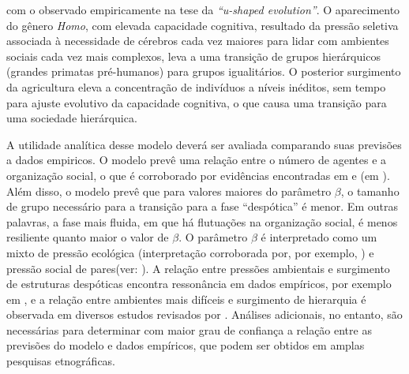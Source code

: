 com o observado empiricamente na tese da \textit{``u-shaped evolution''}. O aparecimento do gênero \textit{Homo}, com elevada capacidade cognitiva, resultado da pressão seletiva associada à necessidade de cérebros cada vez maiores para lidar com ambientes sociais cada vez mais complexos, leva a uma transição de grupos hierárquicos (grandes primatas pré-humanos) para grupos igualitários. O posterior surgimento da agricultura eleva a concentração de indivíduos a níveis inéditos, sem tempo para ajuste evolutivo da capacidade cognitiva, o que causa uma transição para uma sociedade hierárquica. 

A utilidade analítica desse modelo deverá ser avaliada comparando suas previsões a dados empiricos. O modelo prevê uma relação entre o número de agentes e a organização social, o que é corroborado por evidências encontradas em \citet{Currie2010}\cite{Currie2010} e \citet{Kennett2008}\cite{Kennett2008}(em \citet{Clark2008}). Além disso, o modelo prevê que para valores maiores do parâmetro $\beta$, o tamanho de grupo necessário para a transição para a fase ``despótica'' é menor. Em outras palavras, a fase mais fluida, em que há flutuações na organização social, é menos resiliente quanto maior o valor de $\beta$. O parâmetro $\beta$ é interpretado como um mixto de pressão ecológica (interpretação corroborada por, por exemplo, \citet{Earle1997}\cite{Earle1997}) e pressão social de pares(ver: \citet{NCaticha2011}). A relação entre pressões ambientais e surgimento de estruturas despóticas encontra ressonância em dados empíricos, por exemplo em \citet{Kennett2008}, e a relação entre ambientes mais difíceis e surgimento de hierarquia é observada em diversos estudos revisados por \citet{Summers2005}\cite{Summers2005}. Análises adicionais, no entanto, são necessárias para determinar com maior grau de confiança a relação entre as previsões do modelo e dados empíricos, que podem ser obtidos em amplas pesquisas etnográficas. 